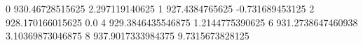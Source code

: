 0 930.46728515625 2.297119140625
1 927.4384765625 -0.731689453125
2 928.170166015625 0.0
4 929.3846435546875 1.2144775390625
6 931.2738647460938 3.10369873046875
8 937.9017333984375 9.7315673828125
